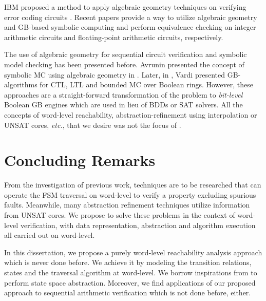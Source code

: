 IBM proposed a method to apply algebraic geometry techniques 
on verifying error coding circuits \cite{BLUEVERI}.
Recent papers \cite{rolf:date16,rolf:FMCAD16} provide a way to utilize 
algebraic geometry and GB-based symbolic computing and perform 
equivalence checking on integer arithmetic circuits and floating-point 
arithmetic circuits, respectively.

The use of algebraic geometry
for sequential circuit verification and symbolic model checking has
been presented before. Avrunin presented the
concept of symbolic MC using algebraic geometry in
\cite{Avrunin:CAV}. Later, in \cite{vardi-iasted07}, Vardi presented
GB-algorithms for CTL, LTL and 
bounded MC over Boolean rings. However, these approaches are a
straight-forward transformation of the problem to {\it bit-level}
Boolean GB engines which are used in lieu of BDDs or SAT solvers. All
the concepts of word-level reachability, abstraction-refinement using
interpolation or UNSAT cores, {\it etc.}, that we desire was not the focus of
\cite{Avrunin:CAV,vardi-iasted07}. 

\section{Concluding Remarks}
From the investigation of previous work, techniques are to be researched that 
can operate the FSM traversal on word-level to verify a property excluding spurious 
faults. Meanwhile, many abstraction refinement techniques utilize information from UNSAT cores.
We propose to solve these problems in the context of word-level verification,
with data representation, abstraction and algorithm execution all carried out 
on word-level.

In this dissertation, we propose a purely word-level reachability analysis approach which is never done before.
We achieve it by modeling the transition relations, states and the traversal algorithm at word-level.
We borrow inspirations from \cite{tim:phd,gao:qe-gf-gb} to perform state space abstraction.
Moreover, we find applications of our proposed approach to sequential arithmetic verification which is 
not done before, either.
